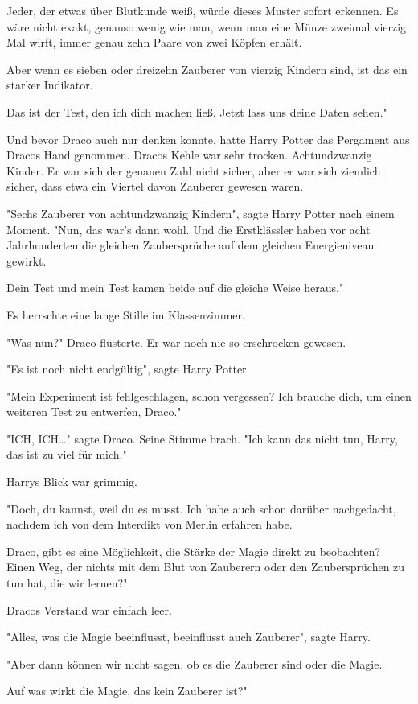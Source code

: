 {Jeder, der etwas über Blutkunde weiß, würde dieses Muster sofort erkennen. Es wäre nicht exakt, genauso wenig wie man, wenn man eine Münze zweimal vierzig Mal wirft, immer genau zehn Paare von zwei Köpfen erhält.

Aber wenn es sieben oder dreizehn Zauberer von vierzig Kindern sind, ist das ein starker Indikator.

Das ist der Test, den ich dich machen ließ. Jetzt lass uns deine Daten sehen."

Und bevor Draco auch nur denken konnte, hatte Harry Potter das Pergament aus Dracos Hand genommen. Dracos Kehle war sehr trocken. Achtundzwanzig Kinder. Er war sich der genauen Zahl nicht sicher, aber er war sich ziemlich sicher, dass etwa ein Viertel davon Zauberer gewesen waren.

"Sechs Zauberer von achtundzwanzig Kindern", sagte Harry Potter nach einem Moment. "Nun, das war's dann wohl. Und die Erstklässler haben vor acht Jahrhunderten die gleichen Zaubersprüche auf dem gleichen Energieniveau gewirkt.

Dein Test und mein Test kamen beide auf die gleiche Weise heraus."

Es herrschte eine lange Stille im Klassenzimmer.

"Was nun?" Draco flüsterte. Er war noch nie so erschrocken gewesen.

"Es ist noch nicht endgültig", sagte Harry Potter.

"Mein Experiment ist fehlgeschlagen, schon vergessen? Ich brauche dich, um einen weiteren Test zu entwerfen, Draco."

"ICH, ICH…" sagte Draco. Seine Stimme brach. "Ich kann das nicht tun, Harry, das ist zu viel für mich."

Harrys Blick war grimmig.

"Doch, du kannst, weil du es musst. Ich habe auch schon darüber nachgedacht, nachdem ich von dem Interdikt von Merlin erfahren habe.

Draco, gibt es eine Möglichkeit, die Stärke der Magie direkt zu beobachten? Einen Weg, der nichts mit dem Blut von Zauberern oder den Zaubersprüchen zu tun hat, die wir lernen?"

Dracos Verstand war einfach leer.

"Alles, was die Magie beeinflusst, beeinflusst auch Zauberer", sagte Harry.

"Aber dann können wir nicht sagen, ob es die Zauberer sind oder die Magie.

Auf was wirkt die Magie, das kein Zauberer ist?"

}
